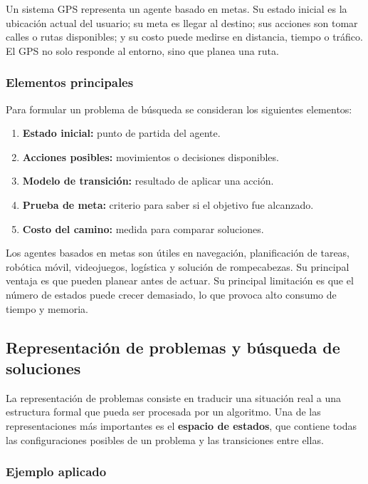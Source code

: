 Un sistema GPS representa un agente basado en metas. Su estado inicial es la ubicación actual del usuario; su meta es llegar al destino; sus acciones son tomar calles o rutas disponibles; y su costo puede medirse en distancia, tiempo o tráfico. El GPS no solo responde al entorno, sino que planea una ruta.

\subsubsection{Elementos principales}

Para formular un problema de búsqueda se consideran los siguientes elementos:

\begin{enumerate}
    \item \textbf{Estado inicial:} punto de partida del agente.
    \item \textbf{Acciones posibles:} movimientos o decisiones disponibles.
    \item \textbf{Modelo de transición:} resultado de aplicar una acción.
    \item \textbf{Prueba de meta:} criterio para saber si el objetivo fue alcanzado.
    \item \textbf{Costo del camino:} medida para comparar soluciones.
\end{enumerate}

Los agentes basados en metas son útiles en navegación, planificación de tareas, robótica móvil, videojuegos, logística y solución de rompecabezas. Su principal ventaja es que pueden planear antes de actuar. Su principal limitación es que el número de estados puede crecer demasiado, lo que provoca alto consumo de tiempo y memoria.

\subsection{Representación de problemas y búsqueda de soluciones}

La representación de problemas consiste en traducir una situación real a una estructura formal que pueda ser procesada por un algoritmo. Una de las representaciones más importantes es el \textbf{espacio de estados}, que contiene todas las configuraciones posibles de un problema y las transiciones entre ellas.

\subsubsection{Ejemplo aplicado}

